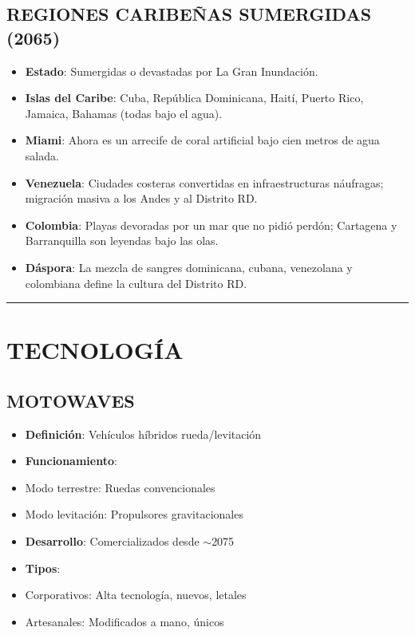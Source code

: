 \documentclass[11pt,a4paper]{report}
\begin{document}
\subsection{REGIONES CARIBEÑAS SUMERGIDAS (2065)}
\begin{itemize}
  \item \textbf{Estado}: Sumergidas o devastadas por La Gran Inundación.
  \item \textbf{Islas del Caribe}: Cuba, República Dominicana, Haití, Puerto Rico, Jamaica, Bahamas (todas bajo el agua).
  \item \textbf{Miami}: Ahora es un arrecife de coral artificial bajo cien metros de agua salada.
  \item \textbf{Venezuela}: Ciudades costeras convertidas en infraestructuras náufragas; migración masiva a los Andes y al Distrito RD.
  \item \textbf{Colombia}: Playas devoradas por un mar que no pidió perdón; Cartagena y Barranquilla son leyendas bajo las olas.
  \item \textbf{Dáspora}: La mezcla de sangres dominicana, cubana, venezolana y colombiana define la cultura del Distrito RD.

\end{itemize}
\bigskip\hrule\bigskip

\section{TECNOLOGÍA}

\subsection{MOTOWAVES}
\begin{itemize}
  \item \textbf{Definición}: Vehículos híbridos rueda/levitación
  \item \textbf{Funcionamiento}:
  \item Modo terrestre: Ruedas convencionales
  \item Modo levitación: Propulsores gravitacionales
  \item \textbf{Desarrollo}: Comercializados desde $\sim$2075
  \item \textbf{Tipos}:
  \item Corporativos: Alta tecnología, nuevos, letales
  \item Artesanales: Modificados a mano, únicos

\end{itemize}
\end{document}
